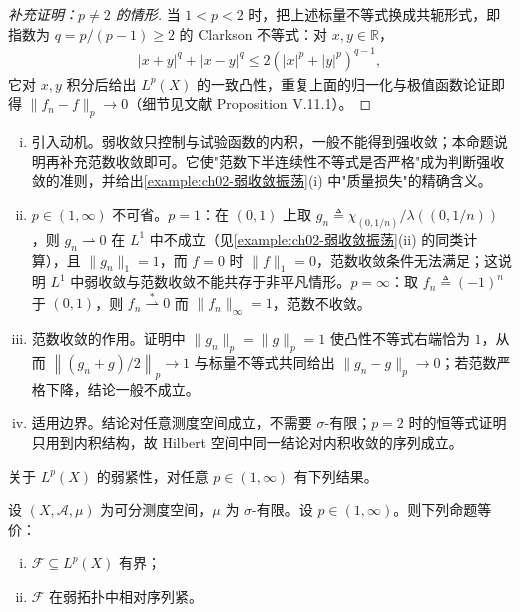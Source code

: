 \documentclass[../../main.tex]{subfiles}%
\begin{document}
\begin{proof}[补充证明：$p\neq2$ 的情形]
当 $1<p<2$ 时，把上述标量不等式换成共轭形式，即指数为 $q=p/(p-1)\geqslant2$ 的 Clarkson 不等式：对 $x,y\in\mathbb R$，
\begin{align*}
|x+y|^q+|x-y|^q\leqslant2(|x|^p+|y|^p)^{q-1},
\end{align*}
它对 $x,y$ 积分后给出 $L^p(X)$ 的一致凸性，重复上面的归一化与极值函数论证即得 $\|f_n-f\|_p\to0$（细节见文献\cite{ref40} Proposition V.11.1）。
\end{proof}

\begin{remark}\label{remark:ch02-RadonRiesz}
\begin{enumerate}[(i)]
\item 引入动机。弱收敛只控制与试验函数的内积，一般不能得到强收敛；本命题说明再补充范数收敛即可。它使"范数下半连续性不等式是否严格"成为判断强收敛的准则，并给出\cref{example:ch02-弱收敛振荡}(i) 中"质量损失"的精确含义。
\item $p\in(1,\infty)$ 不可省。$p=1$：在 $(0,1)$ 上取 $g_n\triangleq\chi_{(0,1/n)}/\lambda((0,1/n))$，则 $g_n\rightharpoonup0$ 在 $L^1$ 中不成立（见\cref{example:ch02-弱收敛振荡}(ii) 的同类计算），且 $\|g_n\|_1=1$，而 $f=0$ 时 $\|f\|_1=0$，范数收敛条件无法满足；这说明 $L^1$ 中弱收敛与范数收敛不能共存于非平凡情形。$p=\infty$：取 $f_n\triangleq(-1)^n$ 于 $(0,1)$，则 $f_n\stackrel{*}{\rightharpoonup}0$ 而 $\|f_n\|_\infty=1$，范数不收敛。
\item 范数收敛的作用。证明中 $\|g_n\|_p=\|g\|_p=1$ 使凸性不等式右端恰为 $1$，从而 $\left\|(g_n+g)/2\right\|_p\to1$ 与标量不等式共同给出 $\|g_n-g\|_p\to0$；若范数严格下降，结论一般不成立。
\item 适用边界。结论对任意测度空间成立，不需要 $\sigma$-有限；$p=2$ 时的恒等式证明只用到内积结构，故 Hilbert 空间中同一结论对内积收敛的序列成立。
\end{enumerate}
\end{remark}

关于 $L^p(X)$ 的弱紧性，对任意 $p\in(1,\infty)$ 有下列结果。

\begin{theorem}\label{theorem:ch02-Lp弱紧}
设 $(X,\mathscr A,\mu)$ 为可分测度空间，$\mu$ 为 $\sigma$-有限。设 $p\in(1,\infty)$。则下列命题等价：
\begin{enumerate}[(i)]
\item $\mathscr F\subseteq L^p(X)$ 有界；
\item $\mathscr F$ 在弱拓扑中相对序列紧。
\end{enumerate}
\end{theorem}
\end{document}
